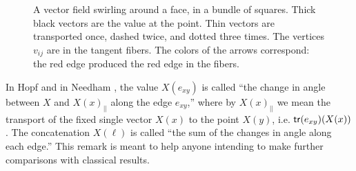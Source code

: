 \begin{figure}[h]
\caption{A vector field swirling around a face, in a bundle of squares. Thick black vectors are the value at the point. Thin vectors are transported once, dashed twice, and dotted three times. The vertices \( v_{ij} \) are in the tangent fibers. The colors of the arrows correspond: the red edge produced the red edge in the fibers.}
\label{fig:swirling}
\end{figure}

\begin{mynote}
In Hopf \cite{hopf} and in Needham \cite{needham}, the value \( X(e_{xy}) \) is called ``the change in angle between \( X \) and \( X(x)_{||} \) along the edge \( e_{xy} \),'' where by \( X(x)_{||} \) we mean the transport of the fixed single vector \( X(x) \) to the point \( X(y) \), i.e. \( \mathsf{tr}(e_{xy})(X(x)) \). The concatenation \( X(\ell) \) is called ``the sum of the changes in angle along each edge.'' This remark is meant to help anyone intending to make further comparisons with classical results.
\end{mynote}
